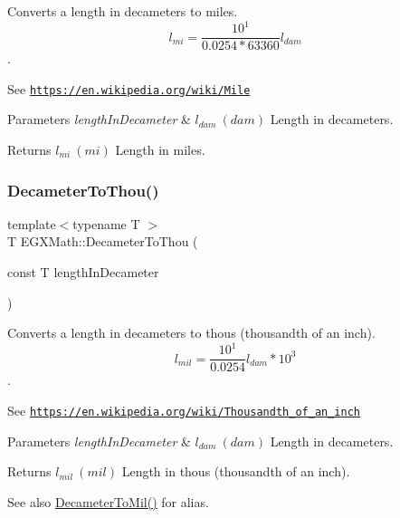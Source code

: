 Converts a length in decameters to miles. \[ l_{mi}=\frac{10^{1}}{0.0254 * 63360} l_{dam} \]. 

See \href{https://en.wikipedia.org/wiki/Mile}{\tt https\+://en.\+wikipedia.\+org/wiki/\+Mile} 
\begin{DoxyParams}{Parameters}
{\em length\+In\+Decameter} & $ l_{dam}\ (dam)$ Length in decameters. \\
\hline
\end{DoxyParams}
\begin{DoxyReturn}{Returns}
$ l_{mi}\ (mi)$ Length in miles. 
\end{DoxyReturn}
\mbox{\label{group___e_g_x_math-_conversions-_length_conversions-_decameter-_imperial_ga4f21f4b1df62d1d63f46849c4f38d56b}} 
\subsubsection{\texorpdfstring{Decameter\+To\+Thou()}{DecameterToThou()}}
{\footnotesize\ttfamily template$<$typename T $>$ \\
T E\+G\+X\+Math\+::\+Decameter\+To\+Thou (\begin{DoxyParamCaption}\item[{const T}]{length\+In\+Decameter }\end{DoxyParamCaption})}



Converts a length in decameters to thous (thousandth of an inch). \[ l_{mil}= \frac{10^{1}}{0.0254} l_{dam} * 10^{3} \]. 

See \href{https://en.wikipedia.org/wiki/Thousandth_of_an_inch}{\tt https\+://en.\+wikipedia.\+org/wiki/\+Thousandth\+\_\+of\+\_\+an\+\_\+inch} 
\begin{DoxyParams}{Parameters}
{\em length\+In\+Decameter} & $ l_{dam}\ (dam)$ Length in decameters. \\
\hline
\end{DoxyParams}
\begin{DoxyReturn}{Returns}
$ l_{mil}\ (mil)$ Length in thous (thousandth of an inch). 
\end{DoxyReturn}
\begin{DoxySeeAlso}{See also}
\mbox{\hyperlink{group___e_g_x_math-_conversions-_length_conversions-_decameter-_imperial_gaee77251b6c2f2e8e0feae0032e80e0c3}{Decameter\+To\+Mil()}} for alias. 
\end{DoxySeeAlso}
\mbox{\label{group___e_g_x_math-_conversions-_length_conversions-_decameter-_imperial_ga42a81b14a91ba9ddb4967faa55b6a3a0}} 

